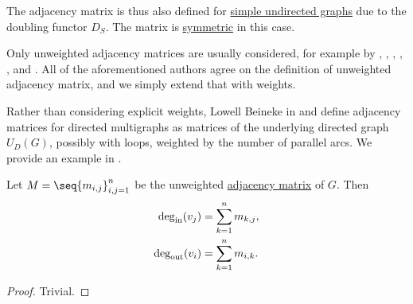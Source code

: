 \begin{comments}
  \item The adjacency matrix is thus also defined for \hyperref[def:undirected_graph]{simple undirected graphs} due to the doubling functor \hyperref[def:graph_functors/simple_doubling]{\( D_S \)}. The matrix is \hyperref[def:transpose_matrix]{symmetric} in this case.

  \item Only unweighted adjacency matrices are usually considered, for example by , , , , ,  and . All of the aforementioned authors agree on the definition of unweighted adjacency matrix, and we simply extend that with weights.

  \item Rather than considering explicit weights, Lowell Beineke in \cite[552]{Rosen1999DiscreteHandbook} and  define adjacency matrices for directed multigraphs as matrices of the underlying directed graph \hyperref[def:graph_functors/directed_forgetful]{\( U_D(G) \)}, possibly with loops, weighted by the number of parallel arcs. We provide an example in .
\end{comments}

\begin{proposition}\label{thm:adjacency_matrix_degree}
  Let \( M = \seq{ m_{i,j} }_{i,j=1}^n \) be the unweighted \hyperref[def:graph_adjacency_matrix]{adjacency matrix} of \( G \). Then
  \begin{align*}
    \deg_{\op{in}}(v_j)  &= \sum_{k=1}^n m_{k,j}, \\
    \deg_{\op{out}}(v_i) &= \sum_{k=1}^n m_{i,k}.
  \end{align*}
\end{proposition}
\begin{proof}
  Trivial.
\end{proof}

